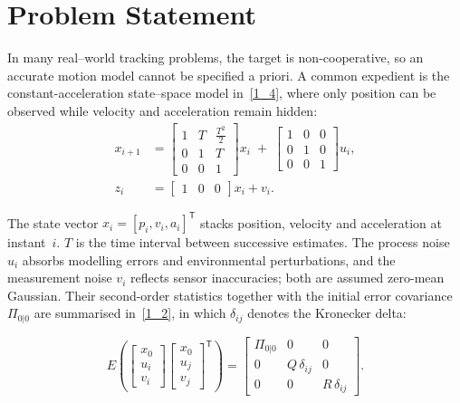 \documentclass[sn-nature]{sn-jnl}%
\theoremstyle{thmstyleone}%
\theoremstyle{thmstyletwo}%
\theoremstyle{thmstylethree}%
\begin{document}
\section{Problem Statement}\label{sec2}
\noindent
In many real–world tracking problems, the target is non-cooperative, so an accurate motion model cannot be specified a priori.  A common expedient is the constant-acceleration state–space model in~\eqref{1_4}, where only position can be observed while velocity and acceleration remain hidden:  
\begin{equation}
\label{1_4}
\begin{aligned}
x_{i+1} &= 
\begin{bmatrix}
1 & T & \tfrac{T^{2}}{2}\\[2pt]
0 & 1 & T\\
0 & 0 & 1
\end{bmatrix} x_i \;+\;
\begin{bmatrix}
1&0&0\\
0&1&0\\
0&0&1
\end{bmatrix} u_i,\\[4pt]
z_i &= 
\begin{bmatrix}
1&0&0
\end{bmatrix} x_i + v_i .
\end{aligned}
\end{equation}

\noindent

\medskip
The state vector \(x_i=[p_i,v_i,a_i]^{\mathsf T}\) stacks position, velocity and acceleration at instant~\(i\). \(T\) is the time interval between successive estimates. The process noise \(u_i\) absorbs modelling errors and environmental perturbations, and the measurement noise \(v_i\) reflects sensor inaccuracies; both are assumed zero-mean Gaussian.  Their second-order statistics together with the initial error covariance \(\Pi_{0|0}\) are summarised in~\eqref{1_2}, in which \(\delta_{ij}\) denotes the Kronecker delta:  

\begin{equation}
\label{1_2}
E\!\left(
\begin{bmatrix}x_0\\u_i\\v_i\end{bmatrix}
\begin{bmatrix}x_0\\u_j\\v_j\end{bmatrix}^{\!\mathsf T}
\right)=
\begin{bmatrix}
\Pi_{0|0} & 0 & 0\\
0 & Q\,\delta_{ij} & 0\\
0 & 0 & R\,\delta_{ij}
\end{bmatrix}.
\end{equation}
\end{document}
